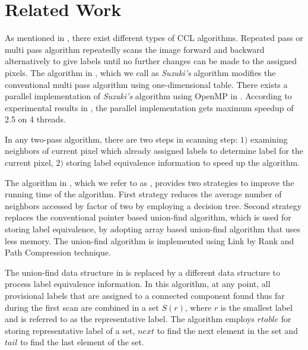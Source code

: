 \vspace{\sectionSpace}
\section{Related Work}
\label{sec:related_works}

As mentioned in \cite{Suzuki2003_Linear}, there exist different types of CCL
algorithms. Repeated pass or multi pass algorithm repeatedly scans the image
forward and backward alternatively to give labels until no further changes can
be made to the assigned
pixels\cite{Haralick1981_Repeated,Hashizume1990_Algorithm}. 
The algorithm in \cite{Suzuki2003_Linear}, which we call as {\em Suzuki's} algorithm modifies the
conventional multi pass algorithm using one-dimensional table. There exists a
parallel implementation of {\em Suzuki's} algorithm using OpenMP in
\cite{Niknam2010_Parallel}. According to experimental results in
\cite{Niknam2010_Parallel}, the parallel implementation gets maximum speedup of
2.5 on 4 threads.

In any two-pass algorithm, there are two steps in scanning step: $1)$ examining neighbors of current pixel which already
assigned labels to determine label for the current pixel, $2)$ storing label equivalence information to speed up the algorithm. 

The algorithm in \cite{Wu2009_LRPC}, which we refer to as \lrpc, provides two strategies to improve the running time of the algorithm.
First strategy reduces the average number of neighbors accessed by factor of two
by employing a decision tree.
Second strategy replaces the conventional pointer based union-find algorithm, which is used for storing label equivalence,
by adopting array based union-find algorithm that uses less memory. The
union-find algorithm is implemented using Link by Rank and Path Compression technique. %

The union-find data structure in \cite{He2008_Run} is replaced by a different data structure to process label equivalence
information. In this algorithm, at any point, all provisional labels that are assigned to a connected 
component found thus far during the first scan are combined in a set $S(r)$, where $r$ is the smallest label and is 
referred to as the representative label. The algorithm employs $rtable$ for storing representative label of a set, $next$ to 
find the next element in the set and $tail$ to find the last element of the set.



